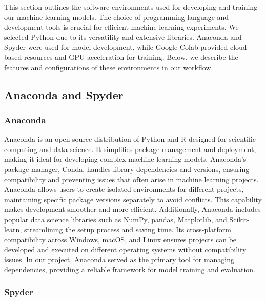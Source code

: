 This section outlines the software environments used for developing and training our machine learning models. The choice of programming language and development tools is crucial for efficient machine learning experiments. We selected Python due to its versatility and extensive libraries. Anaconda and Spyder were used for model development, while Google Colab provided cloud-based resources and GPU acceleration for training. Below, we describe the features and configurations of these environments in our workflow.

\subsection{Anaconda and Spyder}

\subsubsection{Anaconda}

Anaconda is an open-source distribution of Python and R designed for scientific computing and data science. It simplifies package management and deployment, making it ideal for developing complex machine-learning models. Anaconda's package manager, Conda, handles library dependencies and versions, ensuring compatibility and preventing issues that often arise in machine learning projects. Anaconda allows users to create isolated environments for different projects, maintaining specific package versions separately to avoid conflicts. This capability makes development smoother and more efficient. Additionally, Anaconda includes popular data science libraries such as NumPy, pandas, Matplotlib, and Scikit-learn, streamlining the setup process and saving time. Its cross-platform compatibility across Windows, macOS, and Linux ensures projects can be developed and executed on different operating systems without compatibility issues. In our project, Anaconda served as the primary tool for managing dependencies, providing a reliable framework for model training and evaluation.

\subsubsection{Spyder}

